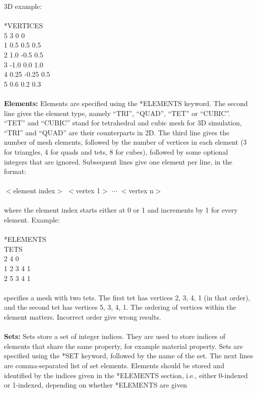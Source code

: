 \documentclass[11pt,fullpage]{article}
\begin{document}
\noindent{}3D example:
\\\\
\noindent{}*VERTICES\\
5 3 0 0\\
1 0.5 0.5 0.5\\
2 1.0 -0.5 0.5\\
3 -1.0 0.0 1.0\\
4 0.25 -0.25 0.5\\
5 0.6 0.2 0.3
\\\\
\noindent{}\textbf{Elements:} Elements are specified using the
*ELEMENTS keyword. The second line gives the element type, namely
``TRI'', ``QUAD'', ``TET'' or ``CUBIC''. ``TET'' and ``CUBIC'' stand
for tetrahedral and cubic mesh for 3D simulation, ``TRI'' and ``QUAD''
are their counterparts in 2D. The third line gives the
number of mesh elements, followed by the number of vertices in each
element (3 for triangles, 4 for quads and tets, 8 for cubes), followed
by some optional integers that are ignored. Subsequent lines give one
element per line, in the format:
\\\\
\noindent{}$<$element index$>$ $<$vertex 1$>$ $\cdots$ $<$vertex n$>$
\\\\
\noindent{}where the element index starts either at 0 or 1 and
increments by 1 for every element. Example:
\\\\
\noindent{}*ELEMENTS\\
TETS\\
2 4 0\\
1 2 3 4 1\\
2 5 3 4 1
\\\\
\noindent{} specifies a mesh with two tets. The first tet has vertices
2, 3, 4, 1 (in that order), and the second tet has vertices 5, 3, 4,
1. The ordering of vertices within the element matters. Incorrect
order give wrong results.
\\\\
\noindent{}\textbf{Sets:} Sets store a set of integer indices. They
are used to store indices of elements that share the same property,
for example material property. Sets are specified using the *SET
keyword, followed by the name of the set. The next lines are
comma-separated list of set elements. Elements should be stored and
identified by the indices given in the *ELEMENTS section, i.e., either
0-indexed or 1-indexed, depending on whether *ELEMENTS are given
\end{document}

